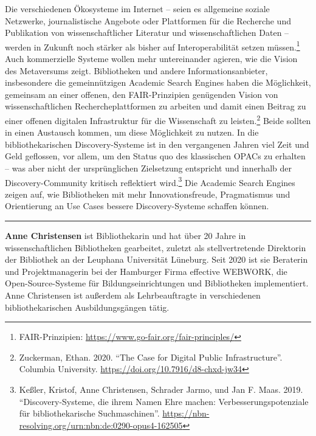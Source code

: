 \documentclass[a4paper,
fontsize=11pt,
oneside,
numbers=noperiodatend,
parskip=half-,
bibliography=totoc,
final
]{scrartcl}
\begin{document}
Die verschiedenen Ökosysteme im Internet -- seien es allgemeine soziale
Netzwerke, journalistische Angebote oder Plattformen für die Recherche
und Publikation von wissenschaftlicher Literatur und wissenschaftlichen
Daten -- werden in Zukunft noch stärker als bisher auf Interoperabilität
setzen müssen.\footnote{FAIR-Prinzipien:
  \url{https://www.go-fair.org/fair-principles/}} Auch kommerzielle
Systeme wollen mehr untereinander agieren, wie die Vision des
Metaversums zeigt. Bibliotheken und andere Informationsanbieter,
insbesondere die gemeinnützigen Academic Search Engines haben die
Möglichkeit, gemeinsam an einer offenen, den FAIR-Prinzipien genügenden
Vision von wissenschaftlichen Rechercheplattformen zu arbeiten und damit
einen Beitrag zu einer offenen digitalen Infrastruktur für die
Wissenschaft zu leisten.\footnote{Zuckerman, Ethan. 2020. \enquote{The
  Case for Digital Public Infrastructure}. Columbia University.
  \url{https://doi.org/10.7916/d8-chxd-jw34}} Beide sollten in einen
Austausch kommen, um diese Möglichkeit zu nutzen. In die
bibliothekarischen Discovery-Systeme ist in den vergangenen Jahren viel
Zeit und Geld geflossen, vor allem, um den Status quo des klassischen
OPACs zu erhalten -- was aber nicht der ursprünglichen Zielsetzung
entspricht und innerhalb der Discovery-Community kritisch reflektiert
wird.\footnote{Keßler, Kristof, Anne Christensen, Schrader Jarmo, und
  Jan F. Maas. 2019. \enquote{Discovery-Systeme, die ihrem Namen Ehre
  machen: Verbesserungspotenziale für bibliothekarische Suchmaschinen}.
  \url{https://nbn-resolving.org/urn:nbn:de:0290-opus4-162505}} Die
Academic Search Engines zeigen auf, wie Bibliotheken mit mehr
Innovationsfreude, Pragmatismus und Orientierung an Use Cases bessere
Discovery-Systeme schaffen können.

\begin{center}\rule{0.5\linewidth}{0.5pt}\end{center}

\textbf{Anne Christensen} ist Bibliothekarin und hat über 20 Jahre in
wissenschaftlichen Bibliotheken gearbeitet, zuletzt als stellvertretende
Direktorin der Bibliothek an der Leuphana Universität Lüneburg. Seit
2020 ist sie Beraterin und Projektmanagerin bei der Hamburger Firma
effective WEBWORK, die Open-Source-Systeme für Bildungseinrichtungen und
Bibliotheken implementiert. Anne Christensen ist außerdem als
Lehrbeauftragte in verschiedenen bibliothekarischen Ausbildungsgängen
tätig.
\end{document}
